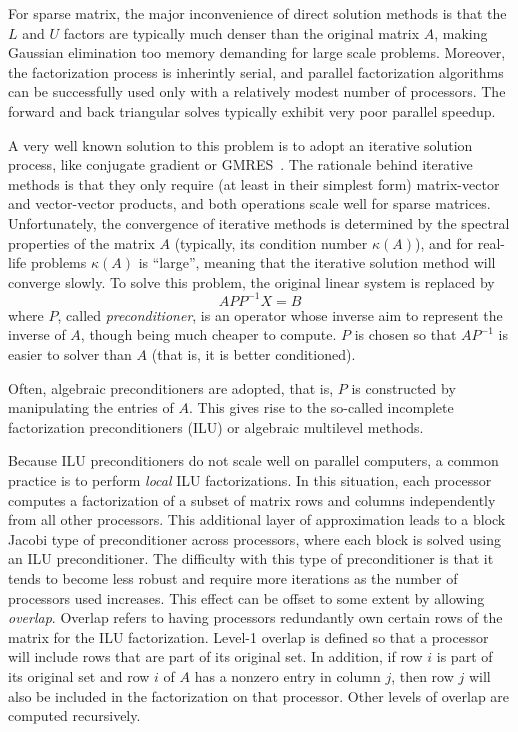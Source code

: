 \documentclass[10pt,relax]{SANDreport}
\begin{document}
For sparse matrix, the major inconvenience of direct solution methods is that
the $L$ and $U$ factors are typically much denser than the original matrix
$A$, making Gaussian elimination too memory demanding for large scale
problems. Moreover, the factorization process is inherintly serial, and
parallel factorization algorithms can be successfully used only with a
relatively modest number of processors. The
forward and back triangular solves typically exhibit very poor parallel speedup.

A very well known solution to this problem is to adopt an iterative solution
process, like conjugate gradient or GMRES~\cite{FIXME}. The rationale behind
iterative methods is that they only require (at least in their simplest form)
matrix-vector and vector-vector products, and both operations scale well for
sparse matrices. Unfortunately, 
the convergence of
iterative methods is determined by the spectral properties of the matrix $A$
(typically, its condition number $\kappa(A)$), and for
real-life problems $\kappa(A)$ is ``large'', meaning that the iterative
solution method will converge slowly. To solve this problem,
the original linear system is replaced by 
\[
A P P^{-1} X = B
\]
where $P$, called {\sl preconditioner}, is an operator whose inverse aim to
represent the inverse of $A$, though being much cheaper to compute.
$P$ is chosen so that $AP^{-1}$ is easier to solver than $A$ 
(that is, it is better conditioned). 

\smallskip

Often, algebraic preconditioners are adopted, that is, $P$ is constructed by
manipulating the entries of $A$. This gives rise to the so-called incomplete
factorization preconditioners (ILU) or algebraic multilevel methods. 

Because ILU preconditioners do not scale well on parallel computers, a common
practice is to perform {\em local} ILU factorizations.  In this situation,
each processor computes a factorization of a subset of matrix rows and
columns independently from all other processors.  This additional layer of
approximation leads to a block Jacobi type of preconditioner across
processors, where each block is solved using an ILU preconditioner.  The
difficulty with this type of preconditioner is that it tends to become less
robust and require more iterations as the number of processors used
increases.  This effect can be offset to some extent by allowing {\em
overlap}.  Overlap refers to having processors redundantly own certain
rows of the matrix for the ILU factorization.  Level-1 overlap is defined
so that a processor will include rows that are part of its original set.
In addition, if row $i$ is part of its original set and row $i$ of $A$ has
a nonzero entry in column $j$, then row $j$ will also be included in the
factorization on that processor.  Other levels of overlap are computed
recursively. 
\end{document}
